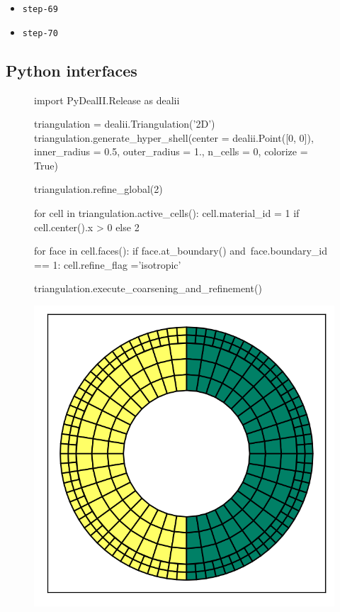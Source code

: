 \documentclass{ansarticle-preprint}
\begin{document}
\begin{itemize}
\item \texttt{step-69}

\item \texttt{step-70}
\end{itemize}


\subsection{Python interfaces}
\label{subsec:python}

\begin{figure}
\renewcommand\figurename{Listing}

\centering

\begin{python}
import PyDealII.Release as dealii

triangulation = dealii.Triangulation('2D')
triangulation.generate_hyper_shell(center = dealii.Point([0, 0]),
                    inner_radius = 0.5, outer_radius = 1.,
                    n_cells = 0, colorize = True)

triangulation.refine_global(2)

for cell in triangulation.active_cells():
    cell.material_id = 1 if cell.center().x > 0 else 2

    for face in cell.faces():
        if face.at_boundary() and\
           face.boundary_id == 1:
            cell.refine_flag ='isotropic'

triangulation.execute_coarsening_and_refinement()
\end{python}

\includegraphics{python_mesh.png}


\end{figure}
\end{document}
